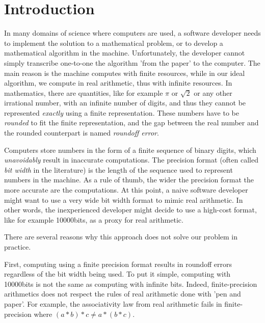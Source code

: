
\chapter{Introduction}

\setupuuchapterbib
%
In many domains of science where computers are used, a software developer needs to implement the solution to a mathematical problem, or to develop a mathematical algorithm in the machine.
%
Unfortunately, the developer cannot simply transcribe one-to-one the algorithm 'from the paper' to the computer.
%
%
The main reason is the machine computes with finite resources, while in our ideal algorithm, we compute in real arithmetic, thus with infinite resources.
%
In mathematics, there are quantities, like for example $\pi$ or $\sqrt{2}$ or any other irrational number, with an infinite number of digits, and thus they cannot be represented \emph{exactly} using a finite representation.
%
These numbers have to be \emph{rounded} to fit the finite representation, and the gap between the real number and the rounded counterpart is named \emph{roundoff error}.

%
Computers store numbers in the form of a finite sequence of binary digits, which \emph{unavoidably} result in inaccurate computations.
%
The precision format (often called \emph{bit width} in the literature) is the length of the sequence used to represent numbers in the machine.
%
As a rule of thumb, the wider the precision format the more accurate are the computations.
%
At this point, a naive software developer might want to use a very wide bit width format to mimic real arithmetic. 
%
In other words, the inexperienced developer might decide to use a high-cost format, like for example 10000bits, as a proxy for real arithmetic.
%

There are several reasons why this approach does not solve our problem in practice.
%

First, computing using a finite precision format results in roundoff errors regardless of the bit width being used.
%
To put it simple, computing with 10000bits is not the same as computing with infinite bits.
%
Indeed, finite-precision arithmetics does not respect the rules of real arithmetic done with 'pen and paper'.
%
For example, the associativity law from real arithmetic fails in finite-precision where $(a*b)*c \ne a*(b*c)$.


